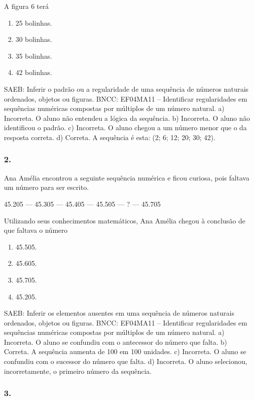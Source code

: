 \begin{enumerate}
\begin{escolha}
\begin{enumerate}
 A figura 6 terá

\begin{enumerate}
\def\labelenumi{\alph{enumi})}
\item
  25 bolinhas.
\item
  30 bolinhas.
\item
  35 bolinhas.
\item
  42 bolinhas.
\end{enumerate}

SAEB: Inferir o padrão ou a regularidade de uma sequência de números naturais ordenados, objetos ou figuras.
BNCC: EF04MA11 -- Identificar regularidades em sequências numéricas compostas por múltiplos de um
número natural.
a) Incorreta. O aluno não entendeu a lógica da sequência.
b) Incorreta. O aluno não identificou o padrão.
c) Incorreta. O aluno chegou a um número menor que o da resposta correta.
d) Correta. A sequência é esta: (2; 6; 12; 20; 30; 42).


\subsubsection{2.}\label{section-37}

Ana Amélia encontrou a seguinte sequência numérica e ficou curiosa, pois
faltava um número para ser escrito.

45.205 --- 45.305 --- 45.405 --- 45.505 --- ? --- 45.705

Utilizando seus conhecimentos matemáticos, Ana Amélia chegou à conclusão de que
faltava o número

\begin{enumerate}
\def\labelenumi{\alph{enumi})}
\item
  45.505.
\item
  45.605.
\item
  45.705.
\item
  45.205.
\end{enumerate}

SAEB: Inferir os elementos ausentes em uma sequência de números naturais ordenados, objetos ou figuras.
BNCC: EF04MA11 -- Identificar regularidades em sequências numéricas compostas por múltiplos de um
número natural.
a) Incorreta. O aluno se confundiu com o antecessor do número que falta.
b) Correta. A sequência aumenta de 100 em 100 unidades.
c) Incorreta. O aluno se confundiu com o sucessor do número que falta.
d) Incorreta. O aluno selecionou, incorretamente, o primeiro número da sequência.


\subsubsection{3.}\label{section-38}


\end{enumerate}
\end{escolha}
\end{enumerate}
